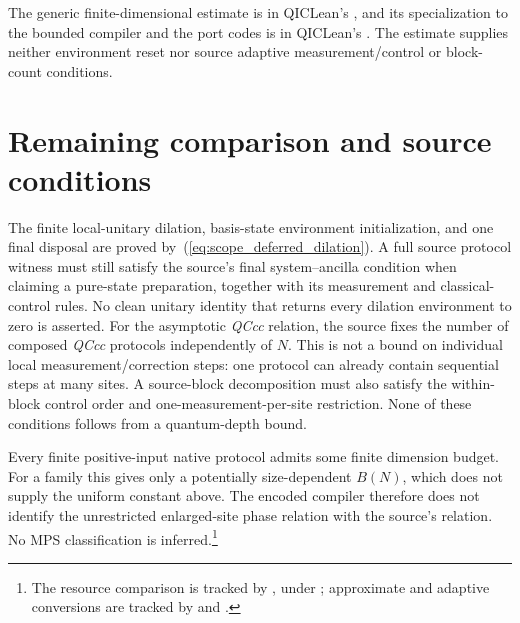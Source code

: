\documentclass{article}
\begin{document}
The generic finite-dimensional estimate is
 in QICLean's
, and its specialization to
the bounded compiler and the port codes is
in QICLean's . The estimate supplies
neither environment reset nor source adaptive measurement/control or
block-count conditions.

\section{Remaining comparison and source conditions}
The finite local-unitary dilation, basis-state environment initialization,
and one final disposal are proved by~(\ref{eq:scope_deferred_dilation}).
A full source protocol witness must still satisfy the source's final
system--ancilla condition when claiming a pure-state preparation, together
with its measurement and classical-control rules. No clean unitary identity
that returns every dilation environment to zero is asserted. For the asymptotic \textit{QCcc} relation, the source fixes the number
of composed \textit{QCcc} protocols independently of $N$. This is not a
bound on individual local measurement/correction steps: one protocol can
already contain sequential steps at many sites. A source-block decomposition
must also satisfy the within-block control order and one-measurement-per-site
restriction. None of these conditions follows from a quantum-depth bound.

Every finite positive-input native protocol admits some finite dimension
budget. For a family this gives only a potentially size-dependent $B(N)$,
which does not supply the uniform constant above. The encoded compiler
therefore does not identify the unrestricted enlarged-site phase relation
with the source's relation. No MPS classification is inferred.\footnote{The
    resource comparison is tracked by , under ;
    approximate and adaptive conversions are tracked by  and
    .}



\end{document}

